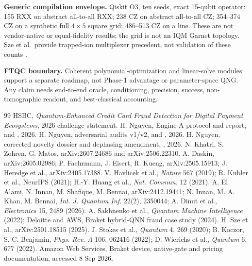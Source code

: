 \documentclass[10pt,a4paper]{article}
\begin{document}
\textbf{Generic compilation envelope.} Qiskit O3, ten seeds, exact 15-qubit
operator: 155 RXX on abstract all-to-all RXX; 238 CZ on abstract all-to-all
CZ; 354--374 CZ on a synthetic full $4\times5$ square grid; 486--513 CZ on a
line. These are not vendor-native or equal-fidelity results; the grid is not an
IQM Garnet topology. Sze et al.\ provide trapped-ion multiplexer precedent,
not validation of these counts \cite{Sze}.

\textbf{FTQC boundary.} Coherent polynomial-optimization and linear-solve
modules support a separate roadmap, not Phase-1 advantage or parameter-space
QNG. Any claim needs end-to-end oracle, conditioning, precision, success,
non-tomographic readout, and best-classical accounting.

\begin{thebibliography}{99}\small\itemsep1pt
 HSBC, \emph{Quantum-Enhanced Credit Card Fraud Detection for
Digital Payment Ecosystems}, 2026 challenge statement.
 H. Nguyen, Engine-A protocol and report,
 and
, 2026.
 H. Nguyen, adversarial audits v1/v2,
 and
, 2026.
 H. Nguyen, corrected novelty dossier and dephasing amendment,
, 2026.
 N. Khatri, S. Zohren, G. Matos, arXiv:2607.24686 and
arXiv:2506.22310.
 A. Daskin, arXiv:2605.02986; P. Faehrmann, J. Eisert,
R. Kueng, arXiv:2505.15913; J. Heredge et al., arXiv:2405.17388.
 V. Havlicek et al., \emph{Nature} 567 (2019);
R. Kubler et al., NeurIPS (2021); H.-Y. Huang et al., \emph{Nat. Commun.}
12 (2021).
 A. El Alami, N. Innan, M. Shafique, M. Bennai,
arXiv:2412.19441; N. Innan, M. A. Khan, M. Bennai, \emph{Int. J. Quantum
Inf.} 22(2), 2350044; A. Dinut et al., \emph{Electronics} 15, 2489 (2026).
 A. Sakhnenko et al., \emph{Quantum Machine Intelligence}
(2022); Deloitte and AWS, Braket hybrid-QNN fraud case study (2024).
 H. Sze et al., arXiv:2501.18515 (2025).
 J. Stokes et al., \emph{Quantum} 4, 269 (2020);
B. Koczor, S. C. Benjamin, \emph{Phys. Rev. A} 106, 062416 (2022);
D. Wierichs et al., \emph{Quantum} 6, 677 (2022).
 Amazon Web Services, Braket device, native-gate and pricing
documentation, accessed 8 Sep 2026.
\end{thebibliography}
\end{document}

